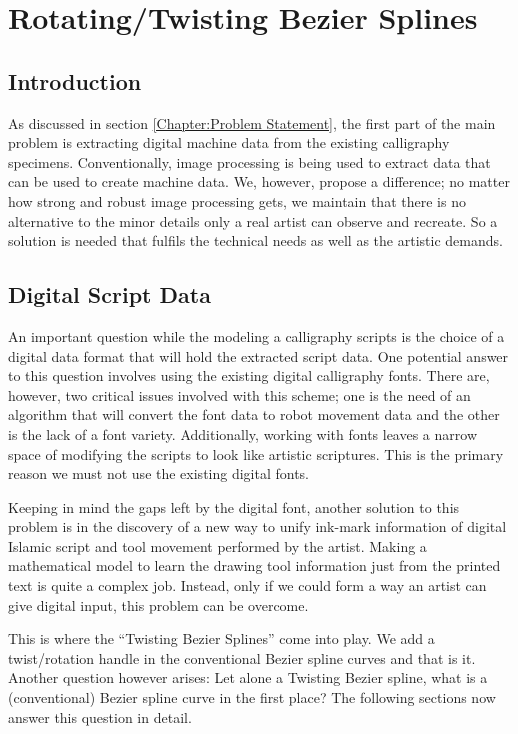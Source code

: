 \section{Rotating/Twisting Bezier Splines}
\label{Chapter:SplineModelling}

    \subsection{Introduction}
    As discussed in section \ref{Chapter:Problem Statement}, the first part of the main problem is extracting digital machine data from the existing calligraphy specimens.  Conventionally, image processing is being used to extract data that can be used to create machine data. We, however, propose a difference; no matter how strong and robust image processing gets, we maintain that there is no alternative to the minor details only a real artist can observe and recreate. So a solution is needed that fulfils the technical needs as well as the artistic demands.


    \subsection{Digital Script Data}

    An important question while the modeling a calligraphy scripts is the choice of a digital data format that will hold the extracted script data. One potential answer to this question involves using the existing digital calligraphy fonts. There are, however, two critical issues involved with this scheme; one is the need of an algorithm that will convert the font data to robot movement data and the other is the lack of a font variety. Additionally, working with fonts leaves a narrow space of modifying the scripts to look like artistic scriptures. This is the primary reason we must not use the existing digital fonts.

    Keeping in mind the gaps left by the digital font, another solution to this problem is in the discovery of a new way to unify ink-mark information of digital Islamic script and tool movement performed by the artist. Making a mathematical model to learn the drawing tool information just from the printed text is quite a complex job. Instead, only if we could form a way an artist can give digital input, this problem can be overcome.

    This is where the ``Twisting Bezier Splines'' come into play. We add a twist/rotation handle in the conventional Bezier spline curves and that is it. Another question however arises: Let alone a Twisting Bezier spline, what is a (conventional) Bezier spline curve in the first place? The following sections now answer this question in detail.

